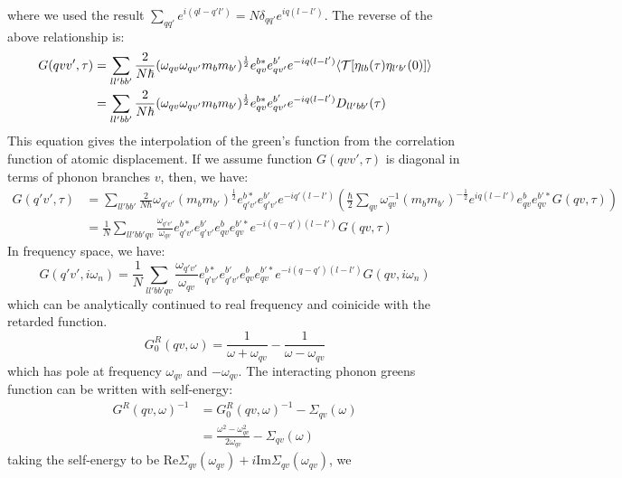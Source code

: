 \documentclass{article}
\begin{document}
where we used the result $\sum_{qq'}e^{i(ql-q'l')} = N\delta_{qq'} e^{iq(l-l')}$. The 
reverse of the above relationship is:
\begin{align}
    G(qvv',\tau) &= \sum_{ll'bb'} \frac{2}{N\hbar} (\omega_{qv}\omega_{qv'}m_bm_{b'})^{\frac{1}{2}}
                e^{b*}_{qv}e_{qv'}^{b'} e^{-iq(l-l')} \langle \mathcal{T}[\eta_{lb}(\tau)\eta_{l'b'}(0)] \rangle \notag \\
                & = \sum_{ll'bb'} \frac{2}{N\hbar} (\omega_{qv}\omega_{qv'}m_bm_{b'})^{\frac{1}{2}}
                e^{b*}_{qv}e_{qv'}^{b'} e^{-iq(l-l')} D_{ll'bb'}(\tau)
\end{align}
This equation gives the interpolation of the green's function from the correlation function
of atomic displacement. If we assume function $G(qvv',\tau)$ is diagonal in terms of 
phonon branches $v$, then, we have:
\begin{align}
    G(q'v',\tau) &= \sum_{ll'bb'} \frac{2}{N\hbar} \omega_{q'v'}(m_bm_{b'})^{\frac{1}{2}}
    e^{b*}_{q'v'}e_{q'v'}^{b'} e^{-iq'(l-l')} \left( \frac{\hbar}{2}\sum_{qv} \omega_{qv}^{-1}(m_bm_{b'})^{-\frac{1}{2}} 
    e^{iq(l-l')} e_{qv}^b e_{qv}^{b'*}
    G(qv,\tau) \right) \\
    &= \frac{1}{N}  \sum_{ll'bb'qv} \frac{ \omega_{q'v'}}{\omega_{qv}}
    e^{b*}_{q'v'}e_{q'v'}^{b'} e_{qv}^b e_{qv}^{b'*} e^{-i(q-q')(l-l')} G(qv,\tau)
\end{align}
In frequency space, we have:
\begin{equation}
    G(q'v',i\omega_n) = \frac{1}{N}  \sum_{ll'bb'qv} \frac{ \omega_{q'v'}}{\omega_{qv}}
    e^{b*}_{q'v'}e_{q'v'}^{b'} e_{qv}^b e_{qv}^{b'*} e^{-i(q-q')(l-l')} G(qv,i\omega_n)
\end{equation}
which can be analytically continued to real frequency and coinicide with the retarded function.
\begin{equation}
    G^R_0(qv,\omega) = \frac{1}{\omega + \omega_{qv}} - \frac{1}{\omega - \omega_{qv}}
\end{equation}
which has pole at frequency $\omega_{qv}$ and $-\omega_{qv}$. 
The interacting phonon greens function can be written with self-energy:
\begin{align}
    G^R(qv, \omega)^{-1} &= G^R_0(qv,\omega)^{-1} - \Sigma_{qv}(\omega) \\
            &= \frac{\omega^2 - \omega_{qv}^2}{2\omega_{qv}} - \Sigma_{qv}(\omega)
\end{align}
taking the self-energy to be $\text{Re}\Sigma_{qv}(\omega_{qv}) + i \text{Im}\Sigma_{qv}(\omega_{qv})$, we 
\end{document}
